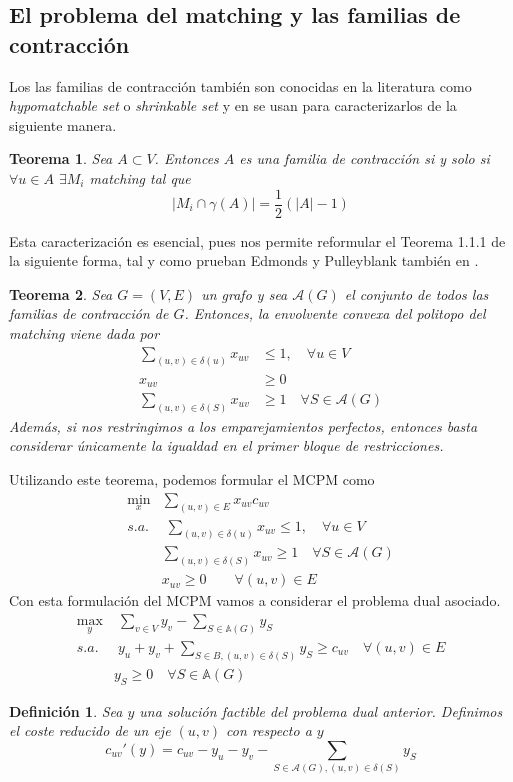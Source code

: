 \documentclass[twoside,a4paper,openright,12pt]{book}
\newtheorem{defi}{Definici\'on}[section]
\newtheorem{thm}{Teorema}[section]
\begin{document}
\subsection{El problema del matching y las familias de contracción}
Los las familias de contracción también son conocidas en la literatura como \textit{hypomatchable set} o \textit{shrinkable set} y en \cite{edmon3} se usan para caracterizarlos de la siguiente manera.
\begin{thm}
Sea $A \subset V$. Entonces $A$ es una familia de contracción si y solo si $\forall u \in A$ $\exists M_i$ matching tal que 
$$
|M_i\cap \gamma(A)| = \frac{1}{2}(|A|-1)
$$
\end{thm}
Esta caracterización es esencial, pues nos permite reformular el Teorema 1.1.1 de la siguiente forma, tal y como prueban Edmonds y Pulleyblank también en \cite{edmon3}.
\begin{thm}
Sea $G=(V,E)$ un grafo y sea $\mathcal{A}(G)$ el conjunto de todos las familias de contracción de $G$. Entonces, la envolvente convexa del politopo del matching viene dada por
\begin{align*}
\sum_{(u,v)\in\delta(u)} x_{uv} &\leq 1, \quad \forall u\in V\\
x_{uv} &\geq 0\\
\sum_{(u,v)\in \delta(S)} x_{uv}& \geq 1 \quad \forall S \in \mathcal{A}(G)	
\end{align*}
Además, si nos restringimos a los emparejamientos perfectos, entonces basta considerar únicamente la igualdad en el primer bloque de restricciones.
\end{thm}
Utilizando este teorema, podemos formular el MCPM como
\begin{align*}
\min_x & \sum_{(u,v) \in E}x_{uv}c_{uv}\\
s.a.&\;\sum_{(u,v)\in\delta(u)} x_{uv} \leq 1, \quad \forall u \in V\\
&\sum_{(u,v)\in \delta(S)} x_{uv} \geq 1\quad \forall S \in \mathcal{A}(G)	\\
&x_{uv} \geq 0 \qquad \forall(u,v)\in E
\end{align*}
Con esta formulación del MCPM vamos a considerar el problema dual asociado.
\begin{align*}
\max_{y} &\; \sum_{v\in V} y_v - \sum_{S\in \mathbb{A}(G)} y_S\\
s.a.&\;y_u+y_v + \sum_{S\in B,(u,v)\in \delta(S)}y_S  \geq c_{uv} \quad \forall (u,v)\in E\\
&y_S\geq 0 \quad \forall S\in \mathbb{A}(G)
\end{align*}
\begin{defi}
Sea $y$ una solución factible del problema dual anterior. Definimos el coste reducido de un eje $(u,v)$ con respecto a $y$
$$
c_{uv}'(y) = c_{uv} - y_u -y_v - \sum_{S\in \mathcal{A}(G),(u,v)\in \delta(S)} y_S
$$ 
\end{defi}
\end{document}
